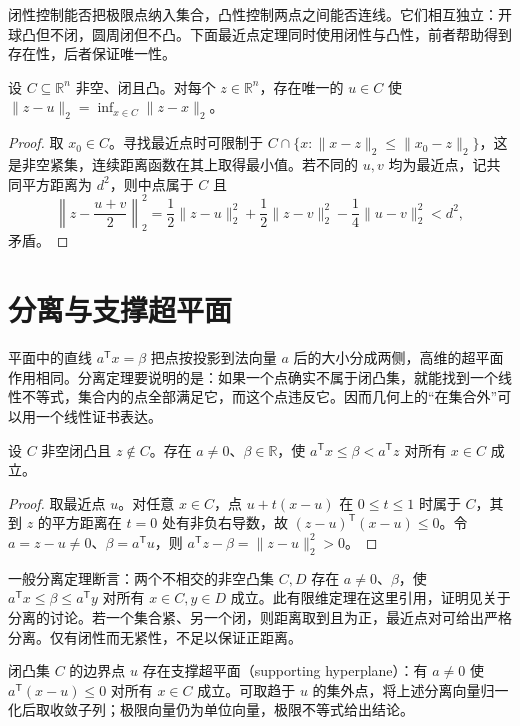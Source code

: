 \documentclass[UTF8,12pt,a4paper,fontset=fandol]{ctexbook}
\begin{document}
闭性控制能否把极限点纳入集合，凸性控制两点之间能否连线。它们相互独立：开球凸但不闭，圆周闭但不凸。下面最近点定理同时使用闭性与凸性，前者帮助得到存在性，后者保证唯一性。

\begin{theorem}[最近点存在唯一性]
设 $C\subseteq\mathbb R^n$ 非空、闭且凸。对每个 $z\in\mathbb R^n$，存在唯一的 $u\in C$ 使 $\|z-u\|_2=\inf_{x\in C}\|z-x\|_2$。
\label{thm:co-projection-existence}
\end{theorem}
\begin{proof}
取 $x_0\in C$。寻找最近点时可限制于 $C\cap\{x:\|x-z\|_2\leq\|x_0-z\|_2\}$，这是非空紧集，连续距离函数在其上取得最小值。若不同的 $u,v$ 均为最近点，记共同平方距离为 $d^2$，则中点属于 $C$ 且
\[
 \left\|z-\frac{u+v}{2}\right\|_2^2
 =\frac12\|z-u\|_2^2+\frac12\|z-v\|_2^2-\frac14\|u-v\|_2^2<d^2,
\]
矛盾。
\end{proof}

\section{分离与支撑超平面}

平面中的直线 $a^{\mathsf T}x=\beta$ 把点按投影到法向量 $a$ 后的大小分成两侧，高维的超平面作用相同。分离定理要说明的是：如果一个点确实不属于闭凸集，就能找到一个线性不等式，集合内的点全部满足它，而这个点违反它。因而几何上的“在集合外”可以用一个线性证书表达。

\begin{theorem}[点与闭凸集的严格分离]
设 $C$ 非空闭凸且 $z\notin C$。存在 $a\ne0$、$\beta\in\mathbb R$，使 $a^{\mathsf T}x\leq\beta<a^{\mathsf T}z$ 对所有 $x\in C$ 成立。
\end{theorem}
\begin{proof}
取最近点 $u$。对任意 $x\in C$，点 $u+t(x-u)$ 在 $0\leq t\leq1$ 时属于 $C$，其到 $z$ 的平方距离在 $t=0$ 处有非负右导数，故 $(z-u)^{\mathsf T}(x-u)\leq0$。令 $a=z-u\ne0$、$\beta=a^{\mathsf T}u$，则 $a^{\mathsf T}z-\beta=\|z-u\|_2^2>0$。
\end{proof}

一般分离定理断言：两个不相交的非空凸集 $C,D$ 存在 $a\ne0$、$\beta$，使 $a^{\mathsf T}x\leq\beta\leq a^{\mathsf T}y$ 对所有 $x\in C,y\in D$ 成立。此有限维定理在这里引用，证明见\cite{boyd-vandenberghe}关于分离的讨论。若一个集合紧、另一个闭，则距离取到且为正，最近点对可给出严格分离。仅有闭性而无紧性，不足以保证正距离。

闭凸集 $C$ 的边界点 $u$ 存在支撑超平面（supporting hyperplane）：有 $a\ne0$ 使 $a^{\mathsf T}(x-u)\leq0$ 对所有 $x\in C$ 成立。可取趋于 $u$ 的集外点，将上述分离向量归一化后取收敛子列；极限向量仍为单位向量，极限不等式给出结论。
\end{document}
